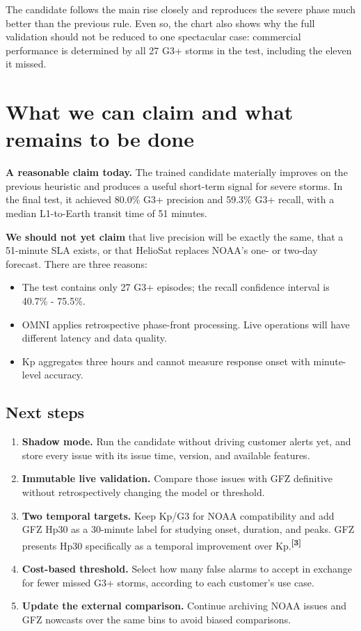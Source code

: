 \documentclass[10pt,a4paper]{article}
\let\plainsection\section
\renewcommand{\section}[1]{\plainsection{\color{Navy}#1}}
\let\plainsubsection\subsection
\renewcommand{\subsection}[1]{\plainsubsection{\color{Ink}#1}}
\newenvironment{summarybox}{\begin{center}\setlength{\fboxsep}{4mm}\begin{lrbox}{\summarysave}\begin{minipage}{0.90\textwidth}}{\end{minipage}\end{lrbox}\colorbox{CyanSoft}{\usebox{\summarysave}}\end{center}}
\newcommand{\source}[1]{\textsuperscript{\color{Cyan}\textbf{[#1]}}}
\begin{document}
The candidate follows the main rise closely and reproduces the severe phase much better than the previous rule. Even so, the chart also shows why the full validation should not be reduced to one spectacular case: commercial performance is determined by all 27 G3+ storms in the test, including the eleven it missed.

\section{What we can claim and what remains to be done}

\begin{summarybox}
\textbf{A reasonable claim today.} The trained candidate materially improves on the previous heuristic and produces a useful short-term signal for severe storms. In the final test, it achieved 80.0\% G3+ precision and 59.3\% G3+ recall, with a median L1-to-Earth transit time of 51 minutes.
\end{summarybox}

\textbf{We should not yet claim} that live precision will be exactly the same, that a 51-minute SLA exists, or that HelioSat replaces NOAA's one- or two-day forecast. There are three reasons:
\begin{itemize}
  \item The test contains only 27 G3+ episodes; the recall confidence interval is 40.7\% - 75.5\%.
  \item OMNI applies retrospective phase-front processing. Live operations will have different latency and data quality.
  \item Kp aggregates three hours and cannot measure response onset with minute-level accuracy.
\end{itemize}

\subsection{Next steps}

\begin{enumerate}
  \item \textbf{Shadow mode.} Run the candidate without driving customer alerts yet, and store every issue with its issue time, version, and available features.
  \item \textbf{Immutable live validation.} Compare those issues with GFZ definitive without retrospectively changing the model or threshold.
  \item \textbf{Two temporal targets.} Keep Kp/G3 for NOAA compatibility and add GFZ Hp30 as a 30-minute label for studying onset, duration, and peaks. GFZ presents Hp30 specifically as a temporal improvement over Kp.\source{3}
  \item \textbf{Cost-based threshold.} Select how many false alarms to accept in exchange for fewer missed G3+ storms, according to each customer's use case.
  \item \textbf{Update the external comparison.} Continue archiving NOAA issues and GFZ nowcasts over the same bins to avoid biased comparisons.
\end{enumerate}
\end{document}
